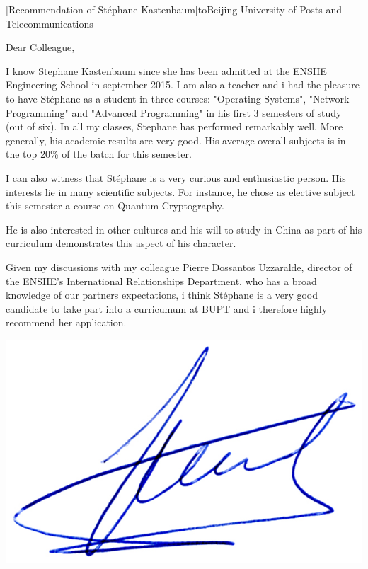\documentclass[a4paper,10pt]{article}
\begin{document}

\begin{letter}[Recommendation of Stéphane Kastenbaum]{to}{Beijing University of
    Posts and Telecommunications}

Dear Colleague, 

I know Stephane Kastenbaum since she has been admitted at the ENSIIE Engineering
School in september  2015.  I am also a  teacher and i had the  pleasure to have
Stéphane  as  a   student  in  three  courses:   "Operating  Systems",  "Network
Programming" and "Advanced  Programming" in his first 3 semesters  of study (out
of  six). In  all  my  classes, Stephane  has  performed  remarkably well.  More
generally, his academic  results are very good. His average  overall subjects is
in the top 20\% of the batch for this semester.

I can also witness that Stéphane is  a very curious and enthusiastic person. His
interests lie  in many scientific subjects.  For instance, he chose  as elective
subject this semester a course on Quantum Cryptography.

He is also interested in other cultures and his will to  study in China as part 
of his curriculum demonstrates this aspect of his character.

Given my discussions  with my colleague Pierre Dossantos  Uzzaralde, director of
the ENSIIE's International  Relationships Department, who has  a broad knowledge
of our partners  expectations, i think Stéphane is a very good  candidate to take
part into a curricumum at BUPT and i therefore highly recommend her application.

\end{letter}
\begin{flushright}
\includegraphics[width=.26\textwidth]{signgenaud.jpg}
\end{flushright}
%
%
\end{document}
